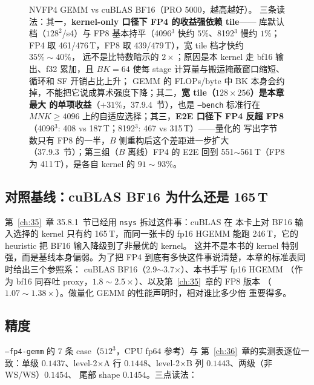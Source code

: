 \begin{figure}[H]
\caption{NVFP4 GEMM vs cuBLAS BF16（PRO 5000，越高越好）。
三条读法：其一，\textbf{kernel-only 口径下 FP4 的收益强依赖 tile}——
库默认档（$128^2$/s4）与 FP8 基本持平（4096$^3$ 快约 $5\%$、8192$^3$ 慢约 $1\%$；
FP4 取 461/476\,T，FP8 取 439/479\,T），宽 tile 档才快约 $35\%\sim40\%$，
远不是比特数暗示的 $2\times$；原因是本 kernel 走 bf16 输出、f32
累加，且 $BK{=}64$ 使每 stage 计算量与搬运掩蔽窗口缩短、循环和 SF 开销占比上升；
GEMM 的 FLOPs/byte 中 BK 本身会约掉，不能把它说成算术强度下降；其二，\textbf{宽 tile（$128{\times}256$）是本章最大
的单项收益}（$+31\%$，37.9.4~节），也是 \texttt{--bench} 标准行在
$MNK\ge4096$ 上的自适应选择；其三，\textbf{E2E 口径下 FP4 反超
FP8}（4096$^3$: 408 vs 187\,T；8192$^3$: 467 vs 315\,T）——量化的
写出字节数只有 FP8 的一半，$B$ 侧重构后这个差距进一步扩大
（37.9.3~节）；第三组（$B$ 离线）FP4 的 E2E 回到
551$\sim$561\,T（FP8 为 411\,T），是各自 kernel 的 $91\sim93\%$。}
\label{fig:37-perf}
\end{figure}

\subsection{对照基线：cuBLAS BF16 为什么还是 165\,T}

第~\ref{ch:35}~章 35.8.1~节已经用 \texttt{nsys} 拆过这件事：cuBLAS 在
本卡上对 BF16 输入选择的 kernel 只有约 165\,T，而同一张卡的 fp16 HGEMM
能跑 246\,T，它的 heuristic 把 BF16 输入降级到了非最优的 kernel。
这并不是本书的 kernel 特别强，而是基线本身偏弱。为了把 FP4
到底有多快这件事说清楚，本章的标准表同时给出三个参照系：
cuBLAS BF16（2.9$\sim$3.7$\times$）、本书手写 fp16 HGEMM
（作为 bf16 同吞吐 proxy，$1.8\sim2.5\times$）、以及第~\ref{ch:35}~章的 FP8 版本
（$1.07\sim1.38\times$）。做量化 GEMM 的性能声明时，相对谁比多少倍
重要得多。

\subsection{精度}

\texttt{--fp4-gemm} 的 7 条 case（$512^3$，CPU fp64 参考）与
第~\ref{ch:36}~章的实测表逐位一致：单级 $0.1437$、level-2$\times$A 行
$0.1448$、level-2$\times$B 列 $0.1443$、两级（非 WS/WS）$0.1454$、
尾部 shape $0.1454$。三点读法：

